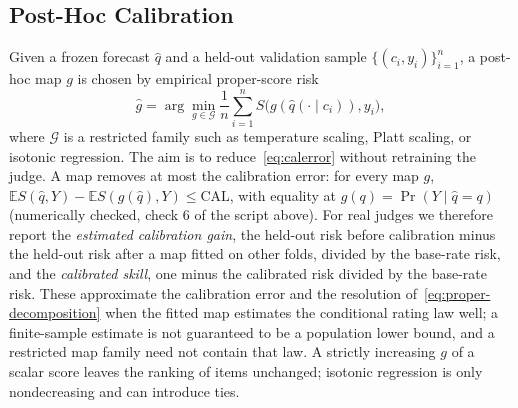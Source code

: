 \subsection{Post-Hoc Calibration}
Given a frozen forecast $\hat q$ and a held-out validation sample $\{(c_i,y_i)\}_{i=1}^n$, a post-hoc map $g$ is chosen by empirical proper-score risk
\begin{equation}
\label{eq:posthoc-cal}
\hat g
=
\arg\min_{g\in\mathcal{G}}
\frac{1}{n}\sum_{i=1}^{n} S\bigl(g(\hat q(\cdot\mid c_i)),y_i\bigr),
\end{equation}
where $\mathcal{G}$ is a restricted family such as temperature scaling, Platt scaling, or isotonic regression.
The aim is to reduce~\eqref{eq:calerror} without retraining the judge.
A map removes at most the calibration error: for every map $g$, $\mathbb{E}S(\hat q,Y)-\mathbb{E}S(g(\hat q),Y)\le\mathrm{CAL}$, with equality at $g(q)=\Pr(Y\mid\hat q=q)$ (numerically checked, check 6 of the script above).
For real judges we therefore report the \emph{estimated calibration gain}, the held-out risk before calibration minus the held-out risk after a map fitted on other folds, divided by the base-rate risk, and the \emph{calibrated skill}, one minus the calibrated risk divided by the base-rate risk.
These approximate the calibration error and the resolution of~\eqref{eq:proper-decomposition} when the fitted map estimates the conditional rating law well; a finite-sample estimate is not guaranteed to be a population lower bound, and a restricted map family need not contain that law.
A strictly increasing $g$ of a scalar score leaves the ranking of items unchanged; isotonic regression is only nondecreasing and can introduce ties.

